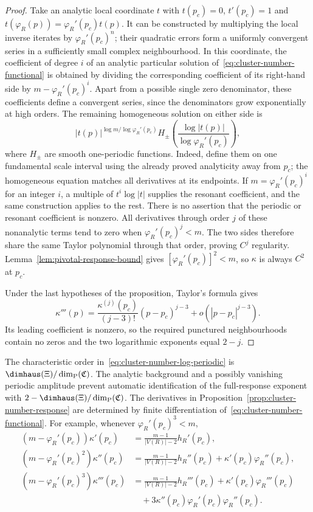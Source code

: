 \begin{proof}
Take an analytic local coordinate $t$ with $t(p_c)=0$, $t'(p_c)=1$ and
$t(\varphi_R(p))=\varphi_R'(p_c)t(p)$.
It can be constructed by multiplying the local inverse iterates by $\varphi_R'(p_c)^n$; their quadratic errors form a uniformly convergent series in a sufficiently small complex neighbourhood.
In this coordinate, the coefficient of degree $i$ of an analytic particular solution of~\eqref{eq:cluster-number-functional} is obtained by dividing the corresponding coefficient of its right-hand side by $m-\varphi_R'(p_c)^i$.
Apart from a possible single zero denominator, these coefficients define a convergent series, since the denominators grow exponentially at high orders.
The remaining homogeneous solution on either side is
\begin{equation}\label{eq:cluster-number-log-periodic}
 |t(p)|^{\log m/\log\varphi_R'(p_c)}
 H_\pm\!\left(\frac{\log|t(p)|}{\log\varphi_R'(p_c)}\right),
\end{equation}
where $H_\pm$ are smooth one-periodic functions.
Indeed, define them on one fundamental scale interval using the already proved analyticity away from $p_c$; the homogeneous equation matches all derivatives at its endpoints.
If $m=\varphi_R'(p_c)^i$ for an integer $i$, a multiple of $t^i\log|t|$ supplies the resonant coefficient, and the same construction applies to the rest.
There is no assertion that the periodic or resonant coefficient is nonzero.
All derivatives through order $j$ of these nonanalytic terms tend to zero when $\varphi_R'(p_c)^j<m$.
The two sides therefore share the same Taylor polynomial through that order, proving $C^j$ regularity.
Lemma~\ref{lem:pivotal-response-bound} gives $[\varphi_R'(p_c)]^2<m$, so $\kappa$ is always $C^2$ at $p_c$.

Under the last hypotheses of the proposition, Taylor's formula gives
\[
 \kappa'''(p)=\frac{\kappa^{(j)}(p_c)}{(j-3)!}(p-p_c)^{j-3}
 +o(|p-p_c|^{j-3}).
\]
Its leading coefficient is nonzero, so the required punctured neighbourhoods contain no zeros and the two logarithmic exponents equal $2-j$.
\end{proof}

The characteristic order in~\eqref{eq:cluster-number-log-periodic} is $\dimhaus(\Xi)/\dim_{\mathrm P}(\mathfrak C)$.
The analytic background and a possibly vanishing periodic amplitude prevent automatic identification of the full-response exponent with $2-\dimhaus(\Xi)/\dim_{\mathrm P}(\mathfrak C)$.
The derivatives in Proposition~\ref{prop:cluster-number-response} are determined by finite differentiation of~\eqref{eq:cluster-number-functional}.
For example, whenever $\varphi_R'(p_c)^3<m$,
\begin{align*}
 (m-\varphi_R'(p_c))\kappa'(p_c)
 &=\frac{m-1}{|V(R)|-2}h_R'(p_c),\\
 (m-\varphi_R'(p_c)^2)\kappa''(p_c)
 &=\frac{m-1}{|V(R)|-2}h_R''(p_c)
   +\kappa'(p_c)\varphi_R''(p_c),\\
 (m-\varphi_R'(p_c)^3)\kappa'''(p_c)
 &=\frac{m-1}{|V(R)|-2}h_R'''(p_c)
   +\kappa'(p_c)\varphi_R'''(p_c)\\
 &\quad+3\kappa''(p_c)\varphi_R'(p_c)\varphi_R''(p_c).
\end{align*}

